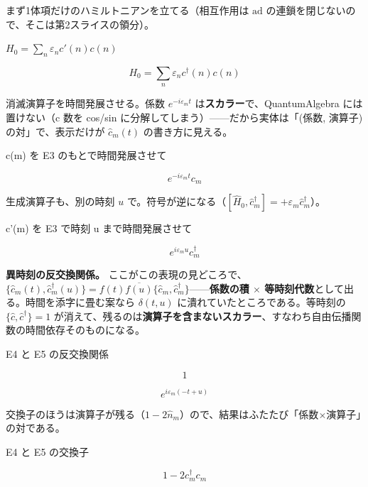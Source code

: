 \documentclass[dvipdfmx,a4paper,11pt]{jsarticle}
\begin{document}
まず1体項だけのハミルトニアンを立てる（相互作用は $\mathrm{ad}$ の連鎖を閉じないので、そこは第2スライスの領分）。

$H_0 = \sum_n \varepsilon_n c'(n) c(n)$

\begin{equation}
  H_0 = \sum_n \varepsilon_n c^{\dagger}(n) c(n)
  \label{eq:E3}
\end{equation}

消滅演算子を時間発展させる。係数 $e^{-i\varepsilon_m t}$ は\textbf{スカラー}で、QuantumAlgebra には置けない（c 数を cos/sin に分解してしまう）——だから実体は「(係数, 演算子) の対」で、表示だけが $\hat c_m(t)$ の書き方に見える。

c(m) を E3 のもとで時間発展させて

\begin{equation}
  e^{- i \varepsilon_{m} t} c_{m}
  \label{eq:E4}
\end{equation}

生成演算子も、別の時刻 $u$ で。符号が逆になる（$[\hat H_0,\hat c^\dagger_m]=+\varepsilon_m\hat c^\dagger_m$）。

c'(m) を E3 で時刻 u まで時間発展させて

\begin{equation}
  e^{i \varepsilon_{m} u} c^{\dagger}_{m}
  \label{eq:E5}
\end{equation}

\textbf{異時刻の反交換関係。} ここがこの表現の見どころで、$\{\hat c_m(t),\hat c^\dagger_m(u)\}=f(t)\overline{f(u)}\{\hat c_m,\hat c^\dagger_m\}$——\textbf{係数の積 $\times$ 等時刻代数}として出る。時間を添字に畳む案なら $\delta(t,u)$ に潰れていたところである。等時刻の $\{\hat c,\hat c^\dagger\}=1$ が消えて、残るのは\textbf{演算子を含まないスカラー}、すなわち自由伝播関数の時間依存そのものになる。

E4 と E5 の反交換関係

\begin{equation}
  1
  \label{eq:E6}
\end{equation}

\begin{equation}
  e^{i \varepsilon_{m} \left(- t + u\right)}
  \label{eq:E7}
\end{equation}

交換子のほうは演算子が残る（$1-2\hat n_m$）ので、結果はふたたび「係数$\times$演算子」の対である。

E4 と E5 の交換子

\begin{equation}
  1 - 2 {c}_{m}^{\dagger} {c}_{m}
  \label{eq:E8}
\end{equation}
\end{document}

